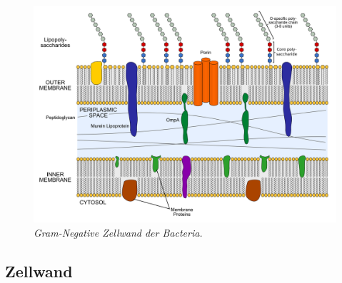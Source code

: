 \begin{description}
		\begin{figure}[ht!]
			\leavevmode
			\begin{center}
				\includegraphics[scale=0.25]{./pictures/gram_negative_zw_noLegend}
			\end{center}
			\caption{\slshape{Gram-Negative Zellwand der Bacteria.}}
			\label{fig:gramNegBacZW}
		\end{figure}
\end{description}

\subsection{Zellwand}
